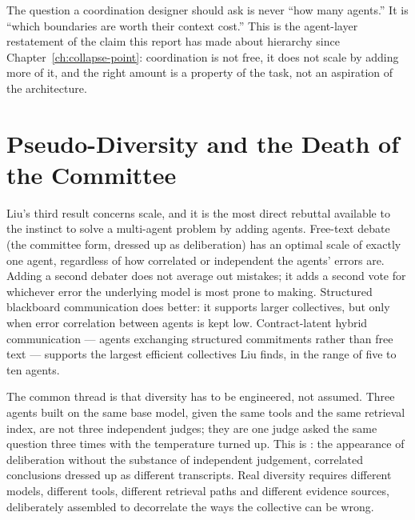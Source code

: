 \begin{keyinsight}
The question a coordination designer should ask is never ``how many agents.'' It is ``which boundaries are worth their context cost.'' This is the agent-layer restatement of the claim this report has made about hierarchy since Chapter~\ref{ch:collapse-point}: coordination is not free, it does not scale by adding more of it, and the right amount is a property of the task, not an aspiration of the architecture.
\end{keyinsight}

\section{Pseudo-Diversity and the Death of the Committee}

Liu's third result concerns scale, and it is the most direct rebuttal available to the instinct to solve a multi-agent problem by adding agents. Free-text debate (the committee form, dressed up as deliberation) has an optimal scale of exactly one agent, regardless of how correlated or independent the agents' errors are. Adding a second debater does not average out mistakes; it adds a second vote for whichever error the underlying model is most prone to making. Structured blackboard communication does better: it supports larger collectives, but only when error correlation between agents is kept low. Contract-latent hybrid communication --- agents exchanging structured commitments rather than free text --- supports the largest efficient collectives Liu finds, in the range of five to ten agents.

The common thread is that diversity has to be engineered, not assumed. Three agents built on the same base model, given the same tools and the same retrieval index, are not three independent judges; they are one judge asked the same question three times with the temperature turned up. This is : the appearance of deliberation without the substance of independent judgement, correlated conclusions dressed up as different transcripts. Real diversity requires different models, different tools, different retrieval paths and different evidence sources, deliberately assembled to decorrelate the ways the collective can be wrong.

